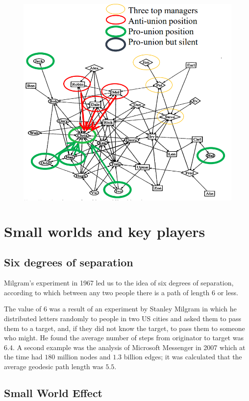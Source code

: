 \documentclass[
  notitlepage,
  onecolumn,
  openany]{book}
\begin{document}
\begin{figure}[h!]

{\centering \includegraphics[width=0.5\linewidth]{images/07-Triads and structural holes/Untitled 3} 

}

\end{figure}

\hypertarget{small-worlds-and-key-players}{%
\section{Small worlds and key players}\label{small-worlds-and-key-players}}

\hypertarget{six-degrees-of-separation}{%
\subsection{Six degrees of separation}\label{six-degrees-of-separation}}

Milgram's experiment in 1967 led us to the idea of six degrees of
separation, according to which between any two people there is a path of
length \(6\) or less.

The value of \(6\) was a result of an experiment by Stanley Milgram in
which he distributed letters randomly to people in two US cities and
asked them to pass them to a target, and, if they did not know the
target, to pass them to someone who might. He found the average number
of steps from originator to target was \(6.4\). A second example was the
analysis of Microsoft Messenger in 2007 which at the time had \(180\)
million nodes and \(1.3\) billion edges; it was calculated that the
average geodesic path length was \(5.5\).

\hypertarget{small-world-effect}{%
\subsection{Small World Effect}\label{small-world-effect}}
\end{document}
